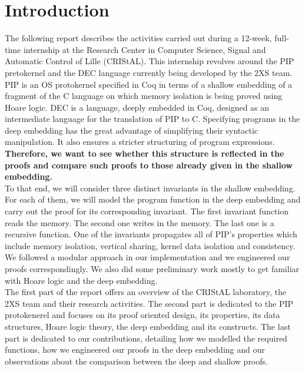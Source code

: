 \chapter{Introduction}
The following report describes the activities carried out during a 12-week, full-time internship at the Research Center in Computer Science, Signal and Automatic Control of Lille (CRIStAL)\cite{cristal}. This internship revolves around the PIP pretokernel and the DEC language currently being developed by the 2XS team. PIP\cite{PIP} is an OS protokernel specified in Coq in terms of a shallow embedding of a fragment of the C language on which memory isolation is being proved using Hoare logic. DEC\cite{DEC} is a language, deeply embedded in Coq, designed as an intermediate language for the translation of PIP to C. Specifying programs in the deep embedding has the great advantage of simplifying their syntactic manipulation. It also ensures a stricter structuring of program expressions. \textbf{Therefore, we want to see whether this structure is reflected in the proofs and compare such proofs to those already given in the shallow embedding.}\\ 

To that end, we will consider three distinct invariants in the shallow embedding. For each of them, we will model the program function in the deep embedding and carry out the proof for its corresponding invariant. The first invariant function reads the memory. The second one writes in the memory. The last one is a recursive function. One of the invariants propagates all of PIP's properties which include memory isolation, vertical sharing, kernel data isolation and consistency. We followed a modular approach in our implementation and we engineered our proofs correspondingly. We also did some preliminary work mostly to get familiar with Hoare logic and the deep embedding. \\

The first part of the report offers an overview of the CRIStAL laboratory, the 2XS team and their research activities. The second part is dedicated to the PIP protokenerel and focuses on its proof oriented design, its properties, its data structures, Hoare logic theory, the deep embedding and its constructs. The last part is dedicated to our contributions, detailing how we modelled the required functions, how we engineered our proofs in the deep embedding and our observations about the comparison between the deep and shallow proofs.
  



